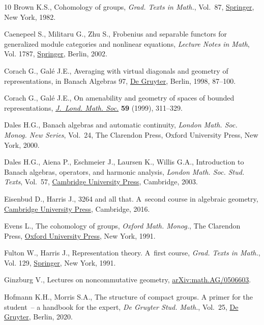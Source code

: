 \begin{thebibliography}{10}
Brown K.S., Cohomology of groups, \textit{Grad. Texts in Math.}, Vol.~87,
 \href{https://doi.org/10.1007/978-1-4684-9327-6}{Springer}, New York, 1982.

Caenepeel S., Militaru G., Zhu S., Frobenius and separable functors for
 generalized module categories and nonlinear equations, \textit{Lecture Notes
 in Math}, Vol. 1787, \href{https://doi.org/10.1007/b83849}{Springer}, Berlin, 2002.

Corach G., Gal\'e J.E., Averaging with virtual diagonals and geometry of
 representations, in Banach {A}lgebras 97, \href{https://doi.org/10.1515/9783110802009.87}{De Gruyter}, Berlin, 1998, 87--100.

Corach G., Gal\'e J.E., On amenability and geometry of spaces of bounded
 representations, \href{https://doi.org/10.1112/S0024610798006759}{\textit{J.~Lond. Math. Soc.}} \textbf{59} (1999), 311--329.

Dales H.G., Banach algebras and automatic continuity, \textit{London Math. Soc.
 Monog. New Series}, Vol.~24, The Clarendon Press, Oxford University Press,
 New York, 2000.

Dales H.G., Aiena P., Eschmeier J., Laursen K., Willis G.A., Introduction to
 {B}anach algebras, operators, and harmonic analysis, \textit{London Math.
 Soc. Stud. Texts}, Vol.~57, \href{https://doi.org/10.1017/CBO9780511615429}{Cambridge University Press}, Cambridge, 2003.

Eisenbud D., Harris J., 3264 and all that. {A}~second course in algebraic
 geometry, \href{https://doi.org/10.1017/CBO9781139062046}{Cambridge University Press}, Cambridge, 2016.

Evens L., The cohomology of groups, \textit{Oxford Math. Monog.}, The Clarendon Press,
 \href{https://doi.org/10.1093/oso/9780198535805.001.0001}{Oxford University Press}, New York, 1991.

Fulton W., Harris J., Representation theory. {A}~first course, \textit{Grad.
 Texts in Math.}, Vol. 129, \href{https://doi.org/10.1007/978-1-4612-0979-9}{Springer}, New York, 1991.

Ginzburg V., Lectures on noncommutative geometry, \href{https://arxiv.org/abs/math.AG/0506603}{arXiv:math.AG/0506603}.

Hofmann K.H., Morris S.A., The structure of compact groups. {A} primer for the
 student~-- a handbook for the expert, \textit{De Gruyter Stud. Math.},
 Vol.~25, \href{https://doi.org/10.1515/9783110695991}{De Gruyter}, Berlin, 2020.


\end{thebibliography}
